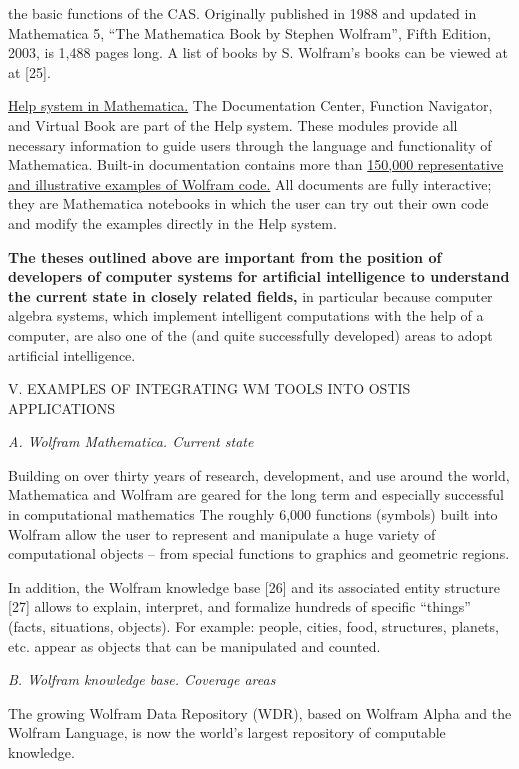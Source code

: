 \documentclass{article}
\begin{document}
\begin{multicols}{2}
\noindent the basic functions of the CAS. Originally published in
1988 and updated in Mathematica 5, “The Mathematica
Book by Stephen Wolfram”, Fifth Edition, 2003, is 1,488
pages long. A list of books by S. Wolfram’s books can
be viewed at at [25].
\par
\uline{Help system in Mathematica.} The Documentation
Center, Function Navigator, and Virtual Book are
part of the Help system. These modules provide
all necessary information to guide users through
the language and functionality of Mathematica.
Built-in documentation contains more than
\uline{150,000 representative and illustrative examples of
Wolfram code.} All documents are fully interactive; they
are Mathematica notebooks in which the user can try
out their own code and modify the examples directly in
the Help system.
\par
\textbf{The theses outlined above are important from
the position of developers of computer systems for
artificial intelligence to understand the current state
in closely related fields,} in particular because computer
algebra systems, which implement intelligent computations with the help of a computer, are also one of the (and
quite successfully developed) areas to adopt artificial
intelligence.
\begin{center}
	V. EXAMPLES OF INTEGRATING WM TOOLS INTO
			OSTIS APPLICATIONS
\end{center}
\textit{A. Wolfram Mathematica. Current state}
\par
Building on over thirty years of research, development,
and use around the world, Mathematica and Wolfram
are geared for the long term and especially successful in
computational mathematics The roughly 6,000 functions
(symbols) built into Wolfram allow the user to represent
and manipulate a huge variety of computational objects –
from special functions to graphics and geometric regions.
\par
In addition, the Wolfram knowledge base [26] and
its associated entity structure [27] allows to explain,
interpret, and formalize hundreds of specific “things”
(facts, situations, objects). For example: people, cities,
food, structures, planets, etc. appear as objects that can
be manipulated and counted.
\par
\textit{B. Wolfram knowledge base. Coverage areas}
\par
The growing Wolfram Data Repository (WDR), based
on Wolfram Alpha and the Wolfram Language, is now
the world’s largest repository of computable knowledge.

\end{multicols}
\end{document}
